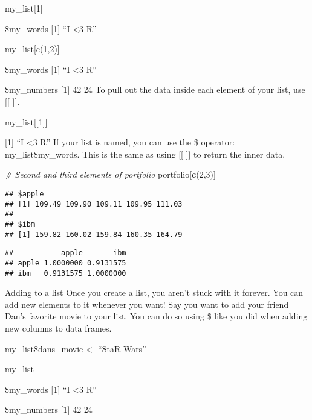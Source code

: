 \documentclass[]{article}
\newenvironment{Shaded}{\begin{snugshade}}{\end{snugshade}}
\newcommand{\KeywordTok}[1]{\textcolor[rgb]{0.13,0.29,0.53}{\textbf{#1}}}
\newcommand{\DecValTok}[1]{\textcolor[rgb]{0.00,0.00,0.81}{#1}}
\newcommand{\CommentTok}[1]{\textcolor[rgb]{0.56,0.35,0.01}{\textit{#1}}}
\newcommand{\OperatorTok}[1]{\textcolor[rgb]{0.81,0.36,0.00}{\textbf{#1}}}
\newcommand{\NormalTok}[1]{#1}
\begin{document}
my\_list{[}1{]}

\$my\_words {[}1{]} ``I \textless{}3 R''

my\_list{[}c(1,2){]}

\$my\_words {[}1{]} ``I \textless{}3 R''

\$my\_numbers {[}1{]} 42 24 To pull out the data inside each element of
your list, use {[}{[} {]}{]}.

my\_list{[}{[}1{]}{]}

{[}1{]} ``I \textless{}3 R'' If your list is named, you can use the \$
operator: my\_list\$my\_words. This is the same as using {[}{[} {]}{]}
to return the inner data.

\begin{Shaded}
\begin{Highlighting}[]
\CommentTok{# Second and third elements of portfolio}
\NormalTok{portfolio[}\KeywordTok{c}\NormalTok{(}\DecValTok{2}\NormalTok{,}\DecValTok{3}\NormalTok{)]}
\end{Highlighting}
\end{Shaded}

\begin{verbatim}
## $apple
## [1] 109.49 109.90 109.11 109.95 111.03
## 
## $ibm
## [1] 159.82 160.02 159.84 160.35 164.79
\end{verbatim}

\begin{Shaded}
\end{Shaded}

\begin{verbatim}
##           apple       ibm
## apple 1.0000000 0.9131575
## ibm   0.9131575 1.0000000
\end{verbatim}

Adding to a list Once you create a list, you aren't stuck with it
forever. You can add new elements to it whenever you want! Say you want
to add your friend Dan's favorite movie to your list. You can do so
using \$ like you did when adding new columns to data frames.

my\_list\$dans\_movie \textless{}- ``StaR Wars''

my\_list

\$my\_words {[}1{]} ``I \textless{}3 R''

\$my\_numbers {[}1{]} 42 24
\end{document}
